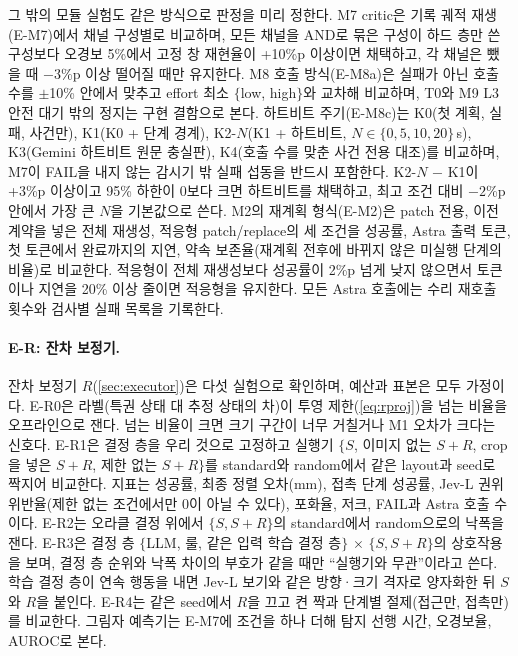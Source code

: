 그 밖의 모듈 실험도 같은 방식으로 판정을 미리 정한다. M7 critic은 기록 궤적 재생(E-M7)에서 채널 구성별로 비교하며, 모든 채널을 AND로 묶은 구성이 하드 층만 쓴 구성보다 오경보 5\%에서 고정 창 재현율이 +10\%p 이상이면 채택하고, 각 채널은 뺐을 때 $-3$\%p 이상 떨어질 때만 유지한다. M8 호출 방식(E-M8a)은 실패가 아닌 호출 수를 $\pm$10\% 안에서 맞추고 effort 최소 $\{$low, high$\}$와 교차해 비교하며, T0와 M9 L3 안전 대기 밖의 정지는 구현 결함으로 본다. 하트비트 주기(E-M8c)는 K0(첫 계획, 실패, 사건만), K1(K0 + 단계 경계), K2-$N$(K1 + 하트비트, $N\in\{0,5,10,20\}$\,s), K3(Gemini 하트비트 원문 충실판), K4(호출 수를 맞춘 사건 전용 대조)를 비교하며, M7이 FAIL을 내지 않는 감시기 밖 실패 섭동을 반드시 포함한다. K2-$N$ $-$ K1이 +3\%p 이상이고 95\% 하한이 0보다 크면 하트비트를 채택하고, 최고 조건 대비 $-2$\%p 안에서 가장 큰 $N$을 기본값으로 쓴다.
M2의 재계획 형식(E-M2)은 patch 전용, 이전 계약을 넣은 전체 재생성, 적응형 patch/replace의 세 조건을 성공률, Astra 출력 토큰, 첫 토큰에서 완료까지의 지연, 약속 보존율(재계획 전후에 바뀌지 않은 미실행 단계의 비율)로 비교한다. 적응형이 전체 재생성보다 성공률이 2\%p 넘게 낮지 않으면서 토큰이나 지연을 20\% 이상 줄이면 적응형을 유지한다. 모든 Astra 호출에는 수리 재호출 횟수와 검사별 실패 목록을 기록한다.

\paragraph{E-R: 잔차 보정기.}
잔차 보정기 $R$(\cref{sec:executor})은 다섯 실험으로 확인하며, 예산과 표본은 모두 가정이다. E-R0은 라벨(특권 상태 대 추정 상태의 차)이 투영 제한(\cref{eq:rproj})을 넘는 비율을 오프라인으로 잰다. 넘는 비율이 크면 크기 구간이 너무 거칠거나 M1 오차가 크다는 신호다. E-R1은 결정 층을 우리 것으로 고정하고 실행기 $\{S$, 이미지 없는 $S{+}R$, crop을 넣은 $S{+}R$, 제한 없는 $S{+}R\}$를 standard와 random에서 같은 layout과 seed로 짝지어 비교한다. 지표는 성공률, 최종 정렬 오차(mm), 접촉 단계 성공률, Jev-L 권위 위반율(제한 없는 조건에서만 0이 아닐 수 있다), 포화율, 저크, FAIL과 Astra 호출 수이다. E-R2는 오라클 결정 위에서 $\{S, S{+}R\}$의 standard에서 random으로의 낙폭을 잰다. E-R3은 결정 층 $\{$LLM, 룰, 같은 입력 학습 결정 층$\}$ $\times$ $\{S, S{+}R\}$의 상호작용을 보며, 결정 층 순위와 낙폭 차이의 부호가 같을 때만 ``실행기와 무관''이라고 쓴다. 학습 결정 층이 연속 행동을 내면 Jev-L 보기와 같은 방향·크기 격자로 양자화한 뒤 $S$와 $R$을 붙인다. E-R4는 같은 seed에서 $R$을 끄고 켠 짝과 단계별 절제(접근만, 접촉만)를 비교한다. 그림자 예측기는 E-M7에 조건을 하나 더해 탐지 선행 시간, 오경보율, AUROC로 본다.

